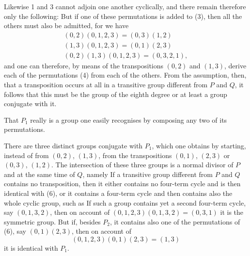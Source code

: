 Likewise 1 and 3 cannot adjoin one another cyclically, and there remain therefore only the following:
But if one of these permutations is added to (3), then all the others must also be admitted, for we have
\[
\begin{gathered}
(0,2)(0,1,2,3) = (0,3)(1,2) \\
(1,3)(0,1,2,3) = (0,1)(2,3) \\
(0,2)(1,3)(0,1,2,3) = (0,3,2,1),
\end{gathered}
\]
and one can therefore, by means of the transpositions $(0,2)$ and $(1,3)$, derive each of the permutations (4) from each of the others. From the assumption, then, that a transposition occurs at all in a transitive group different from $P$ and $Q$, it follows that this must be the group of the eighth degree
or at least a group conjugate with it.

That $P_1$ really is a group one easily recognises by composing any two of its permutations.

There are three distinct groups conjugate with $P_1$, which one obtains by starting, instead of from $(0,2)$, $(1,3)$, from the transpositions $(0,1)$, $(2,3)$ or $(0,3)$, $(1,2)$. The intersection of these three groups is a normal divisor of $P$ and at the same time of $Q$, namely
If a transitive group different from $P$ and $Q$ contains no transposition, then it either contains no four-term cycle and is then identical with (6), or it contains a four-term cycle and then contains also the whole cyclic group, such as
If such a group contains yet a second four-term cycle, say $(0,1,3,2)$, then on account of $(0,1,2,3)(0,1,3,2) = (0,3,1)$ it is the symmetric group. But if, besides $P_2$, it contains also one of the permutations of (6), say $(0,1)(2,3)$, then on account of
\[
(0,1,2,3)(0,1)(2,3) = (1,3)
\]
it is identical with $P_1$.
